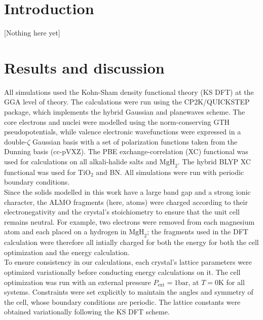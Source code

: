\documentclass[aps,prb,twocolumn,amsmath,amssymb,superscriptaddress,longbibliography]{revtex4-1}
\begin{document}
\section{Introduction} 

[Nothing here yet]



\section*{Results and discussion}
 
All simulations used the Kohn-Sham density functional theory (KS DFT) at the GGA level of theory. 
The calculations were run using the CP2K/QUICKSTEP package\cite{cp2k}, which implements the hybrid Gaussian and planewaves scheme\cite{gpw}. 
The core electrons and nuclei were modelled using the norm-conserving GTH pseudopotentials\cite{gth1,gth2}, while valence electronic wavefunctions were expressed in a $\text{double-}\zeta$  Gaussian basis \cite{gaussian} with a set of polarization functions taken from the Dunning basis (cc-pVXZ)\cite{pol,qs}.
The PBE exchange-correlation (XC) functional\cite{pbe} was used for calculations on all alkali-halide salts and $\text{MgH}_{2}$. 
The hybrid BLYP XC functional\cite{becke,lyp} was used for $\text{TiO}_{2}$ and BN. 
All simulations were run with periodic boundary conditions.\\

Since the solids modelled in this work have a large band gap and a strong ionic character, the ALMO fragments (here, atoms) were charged according to their electronegativity and the crystal's stoichiometry to ensure that the unit cell remains neutral. 
For example, two electrons were removed from each magnesium atom and each placed on a hydrogen in $\text{MgH}_{2}$; the fragments used in the DFT calculation were therefore all intially charged for both the energy for both the cell optimization and the energy calculation.\\  


To ensure consistency in our calculations, each crystal's lattice parameters were optimized variationally before conducting energy calculations on it. 
The cell optimization was run with an external pressure $P_{\text{ext}} = 1 \text{bar}$, at $T = 0 \text{K}$ for all systems. 
Constraints were set explicitly to maintain the angles and symmetry of the cell, whose boundary conditions are periodic. 
The lattice constants were obtained variationally following the KS DFT scheme.\\ 
\end{document}
